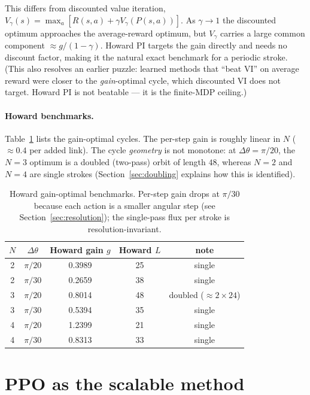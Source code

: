 \documentclass[11pt]{article}
\begin{document}
This differs from discounted value iteration, $V_\gamma(s)=\max_a[R(s,a)+\gamma
V_\gamma(P(s,a))]$. As $\gamma\to1$ the discounted optimum approaches the
average-reward optimum, but $V_\gamma$ carries a large common component
$\approx g/(1-\gamma)$. Howard PI targets the gain directly and needs no
discount factor, making it the natural exact benchmark for a periodic stroke.
(This also resolves an earlier puzzle: learned methods that ``beat VI'' on
average reward were closer to the \emph{gain}-optimal cycle, which discounted
VI does not target. Howard PI is not beatable --- it is the finite-MDP ceiling.)

\paragraph{Howard benchmarks.}
Table~\ref{tab:howard} lists the gain-optimal cycles. The per-step gain is
roughly linear in $N$ ($\approx 0.4$ per added link). The cycle \emph{geometry}
is not monotone: at $\Delta\theta=\pi/20$, the $N=3$ optimum is a doubled
(two-pass) orbit of length $48$, whereas $N=2$ and $N=4$ are single strokes
(Section~\ref{sec:doubling} explains how this is identified).

\begin{table}[htbp]
\centering
\begin{tabular}{c c c c c}
\toprule
$N$ & $\Delta\theta$ & Howard gain $g$ & Howard $L$ & note \\
\midrule
2 & $\pi/20$ & 0.3989 & 25 & single \\
2 & $\pi/30$ & 0.2659 & 38 & single \\
3 & $\pi/20$ & 0.8014 & 48 & doubled ($\approx 2\times24$) \\
3 & $\pi/30$ & 0.5394 & 35 & single \\
4 & $\pi/20$ & 1.2399 & 21 & single \\
4 & $\pi/30$ & 0.8313 & 33 & single \\
\bottomrule
\end{tabular}
\caption{Howard gain-optimal benchmarks. Per-step gain drops at $\pi/30$
because each action is a smaller angular step (see
Section~\ref{sec:resolution}); the single-pass flux per stroke is
resolution-invariant.}
\label{tab:howard}
\end{table}

\section{PPO as the scalable method}
\end{document}
